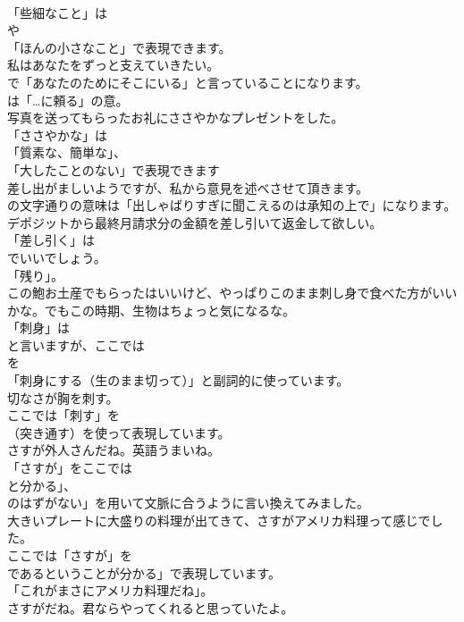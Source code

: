 \documentclass[8pt]{extreport}
\begin{document}
\begin{CJK}{UTF8}{min}
\\	「些細なこと」は
\\	や
\\	「ほんの小さなこと」で表現できます。	
\\	私はあなたをずっと支えていきたい。 
\\	で「あなたのためにそこにいる」と言っていることになります。
\\	は「…に頼る」の意。	
\\	写真を送ってもらったお礼にささやかなプレゼントをした。 
\\	「ささやかな」は
\\	「質素な、簡単な」、
\\	「大したことのない」で表現できます	
\\	差し出がましいようですが、私から意見を述べさせて頂きます。 
\\	の文字通りの意味は「出しゃばりすぎに聞こえるのは承知の上で」になります。	
\\	デポジットから最終月請求分の金額を差し引いて返金して欲しい。 
\\	「差し引く」は
\\	でいいでしょう。
\\	「残り」。	
\\	この鮑お土産でもらったはいいけど、やっぱりこのまま刺し身で食べた方がいいかな。でもこの時期、生物はちょっと気になるな。 
\\	「刺身」は
\\	と言いますが、ここでは
\\	を
\\	「刺身にする（生のまま切って）」と副詞的に使っています。	
\\	切なさが胸を刺す。 
\\	ここでは「刺す」を 
\\	（突き通す）を使って表現しています。	
\\	さすが外人さんだね。英語うまいね。 
\\	「さすが」をここでは
\\	と分かる」、
\\	のはずがない」を用いて文脈に合うように言い換えてみました。	
\\	大きいプレートに大盛りの料理が出てきて、さすがアメリカ料理って感じでした。 
\\	ここでは「さすが」を
\\	であるということが分かる」で表現しています。
\\	「これがまさにアメリカ料理だね」。	
\\	さすがだね。君ならやってくれると思っていたよ。 

\end{CJK}
\end{document}
